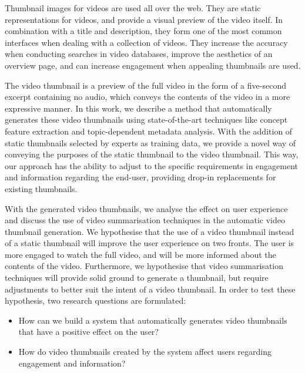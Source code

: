 \documentclass{../resources/sig-alternate-05-2015}
\begin{document}

Thumbnail images for videos are used all over the web. They are static representations for videos, and provide a visual preview of the video itself. In combination with a title and description, they form one of the most common interfaces when dealing with a collection of videos. They increase the accuracy when conducting searches in video databases, improve the aesthetics of an overview page, and can increase engagement when appealing thumbnails are used.

The video thumbnail is a preview of the full video in the form of a five-second excerpt containing no audio, which conveys the contents of the video in a more expressive manner. In this work, we describe a method that automatically generates these video thumbnails using state-of-the-art techniques like concept feature extraction and topic-dependent metadata analysis. With the addition of static thumbnails selected by experts as training data, we provide a novel way of conveying the purposes of the static thumbnail to the video thumbnail. This way, our approach has the ability to adjust to the specific requirements in engagement and information regarding the end-user, providing drop-in replacements for existing thumbnails.

With the generated video thumbnails, we analyse the effect on user experience and discuss the use of video summarisation techniques in the automatic video thumbnail generation. We hypothesise that the use of a video thumbnail instead of a static thumbnail will improve the user experience on two fronts. The user is more engaged to watch the full video, and will be more informed about the contents of the video. Furthermore, we hypothesise that video summarisation techniques will provide solid ground to generate a thumbnail, but require adjustments to better suit the intent of a video thumbnail. In order to test these hypothesis, two research questions are formulated:

\begin{itemize}
	\item How can we build a system that automatically generates video thumbnails that have a positive effect on the user?
	\item How do video thumbnails created by the system affect users regarding engagement and information?
\end{itemize}
\end{document}
